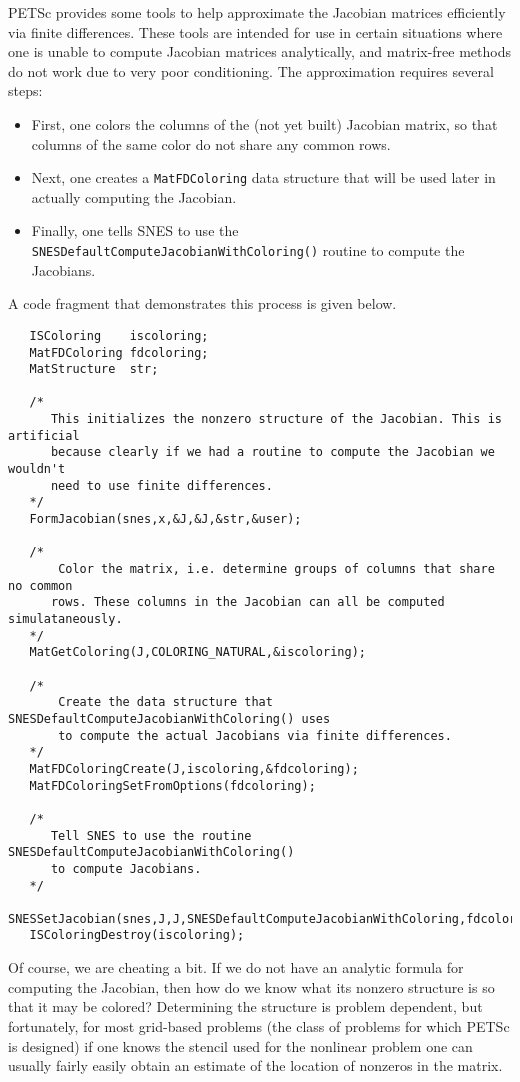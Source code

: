 PETSc provides some tools to help approximate the Jacobian matrices efficiently via 
finite differences.  These tools are intended for use in certain situations where
one is unable to compute Jacobian matrices analytically, and matrix-free methods
do not work due to very poor conditioning.  The approximation requires several steps:
\begin{itemize}
\item First, one colors the columns of the (not yet built) Jacobian matrix, so that 
      columns of the same color do not share any common rows.
\item Next, one creates a {\tt MatFDColoring} data structure that will be used later in 
      actually computing the Jacobian.
\item Finally, one tells SNES to use the {\tt SNESDefaultComputeJacobianWithColoring()}
      routine to compute the Jacobians. 
\end{itemize}
A code fragment that demonstrates this process is given below.
\begin{verbatim}
   ISColoring    iscoloring;
   MatFDColoring fdcoloring;
   MatStructure  str;

   /* 
      This initializes the nonzero structure of the Jacobian. This is artificial
      because clearly if we had a routine to compute the Jacobian we wouldn't
      need to use finite differences.
   */
   FormJacobian(snes,x,&J,&J,&str,&user);

   /*
       Color the matrix, i.e. determine groups of columns that share no common 
      rows. These columns in the Jacobian can all be computed simulataneously.
   */
   MatGetColoring(J,COLORING_NATURAL,&iscoloring);

   /*
       Create the data structure that SNESDefaultComputeJacobianWithColoring() uses
       to compute the actual Jacobians via finite differences.
   */
   MatFDColoringCreate(J,iscoloring,&fdcoloring);
   MatFDColoringSetFromOptions(fdcoloring);

   /*
      Tell SNES to use the routine SNESDefaultComputeJacobianWithColoring()
      to compute Jacobians.
   */
   SNESSetJacobian(snes,J,J,SNESDefaultComputeJacobianWithColoring,fdcoloring);
   ISColoringDestroy(iscoloring);

\end{verbatim}

  
 

Of course, we are cheating a bit. If we do not have an analytic
formula for computing the Jacobian, then how do we know what its
nonzero structure is so that it may be colored?  Determining the
structure is problem dependent, but fortunately, for most grid-based
problems (the class of problems for which PETSc is designed) if one
knows the stencil used for the nonlinear problem one can usually
fairly easily obtain an estimate of the location of nonzeros in
the matrix.

